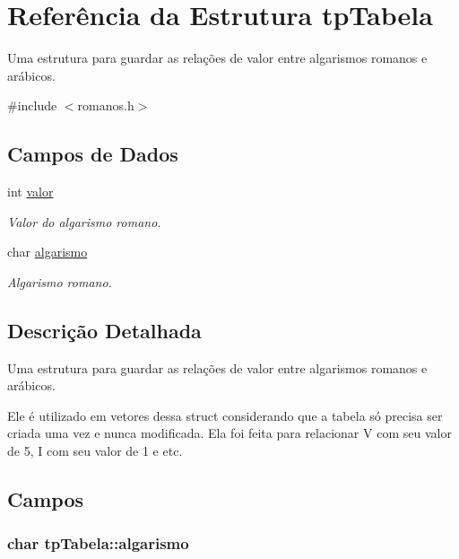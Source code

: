 \hypertarget{structtpTabela}{\section{Referência da Estrutura tp\-Tabela}
\label{structtpTabela}
}


Uma estrutura para guardar as relações de valor entre algarismos romanos e arábicos.  




{\ttfamily \#include $<$romanos.\-h$>$}

\subsection*{Campos de Dados}
\begin{DoxyCompactItemize}
\item 
int \hyperlink{structtpTabela_aa41caf7726025b8cab7eade2dc835874}{valor}
\begin{DoxyCompactList}\small\item\em Valor do algarismo romano. \end{DoxyCompactList}\item 
char \hyperlink{structtpTabela_ad70d0ec0b8fb12006c4de8c479d9f71a}{algarismo}
\begin{DoxyCompactList}\small\item\em Algarismo romano. \end{DoxyCompactList}\end{DoxyCompactItemize}


\subsection{Descrição Detalhada}
Uma estrutura para guardar as relações de valor entre algarismos romanos e arábicos. 

Ele é utilizado em vetores dessa struct considerando que a tabela só precisa ser criada uma vez e nunca modificada. Ela foi feita para relacionar V com seu valor de 5, I com seu valor de 1 e etc. 

\subsection{Campos}
\hypertarget{structtpTabela_ad70d0ec0b8fb12006c4de8c479d9f71a}{
\subsubsection[{algarismo}]{\setlength{\rightskip}{0pt plus 5cm}char tp\-Tabela\-::algarismo}}\label{structtpTabela_ad70d0ec0b8fb12006c4de8c479d9f71a}


